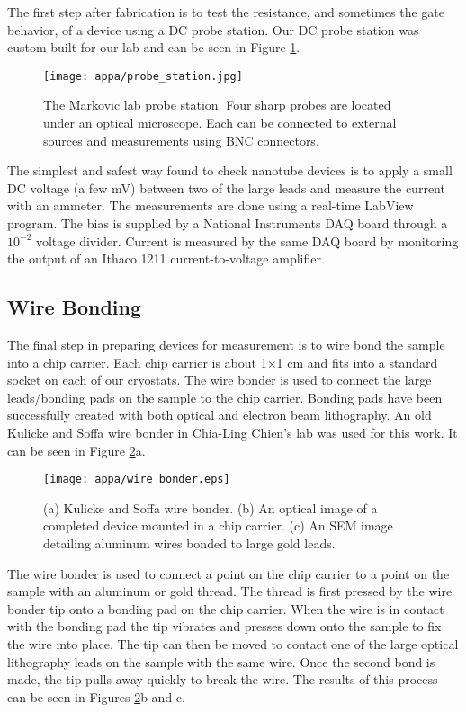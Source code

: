 The first step after fabrication is to test the resistance, and sometimes the gate behavior, of a device using a DC probe station. Our DC probe station was custom built for our lab and can be seen in Figure \ref{fig:probe_station}.

\begin{figure}
	\centering
	\texttt{[image: appa/probe\_station.jpg]}
	\caption{The Markovic lab probe station. Four sharp probes are located under an optical microscope. Each can be connected to external sources and measurements using BNC connectors.}
	\label{fig:probe_station}
\end{figure}

The simplest and safest way found to check nanotube devices is to apply a small DC voltage (a few \si{\milli\volt}) between two of the large leads and measure the current with an ammeter. The measurements are done using a real-time LabView program. The bias is supplied by a National Instruments DAQ board through a $10^{-2}$ voltage divider. Current is measured by the same DAQ board by monitoring the output of an Ithaco 1211 current-to-voltage amplifier. 

\subsection{Wire Bonding}
\label{subsec:wire_bonding}

The final step in preparing devices for measurement is to wire bond the sample into a chip carrier. Each chip carrier is about 1$\times$1 cm and fits into a standard socket on each of our cryostats. The wire bonder is used to connect the large leads/bonding pads on the sample to the chip carrier. Bonding pads have been successfully created with both optical and electron beam lithography. An old Kulicke and Soffa wire bonder in Chia-Ling Chien's lab was used for this work. It can be seen in Figure \ref{fig:wire_bonder}a.

\begin{figure}
	\centering
	\texttt{[image: appa/wire\_bonder.eps]}
	\caption{(a) Kulicke and Soffa wire bonder. (b) An optical image of a completed device mounted in a chip carrier. (c) An SEM image detailing aluminum wires bonded to large gold leads.}
	\label{fig:wire_bonder}
\end{figure}

The wire bonder is used to connect a point on the chip carrier to a point on the sample with an aluminum or gold thread. The thread is first pressed by the wire bonder tip onto a bonding pad on the chip carrier. When the wire is in contact with the bonding pad the tip vibrates and presses down onto the sample to fix the wire into place. The tip can then be moved to contact one of the large optical lithography leads on the sample with the same wire. Once the second bond is made, the tip pulls away quickly to break the wire. The results of this process can be seen in Figures \ref{fig:wire_bonder}b and c.
